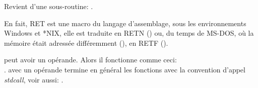 \item[RET] Revient d'une sous-routine: .

En fait, RET
est une macro du langage d'assemblage, sous les environnements Windows et *NIX, elle
est traduite en
RETN ()
ou, du temps de MS-DOS, où la mémoire était adressée différemment
(), en RETF ().

 peut avoir un opérande.
Alors il fonctionne comme ceci: \\
.
 avec un opérande termine en général les fonctions avec la convention d'appel
\emph{stdcall}, voir aussi: .


